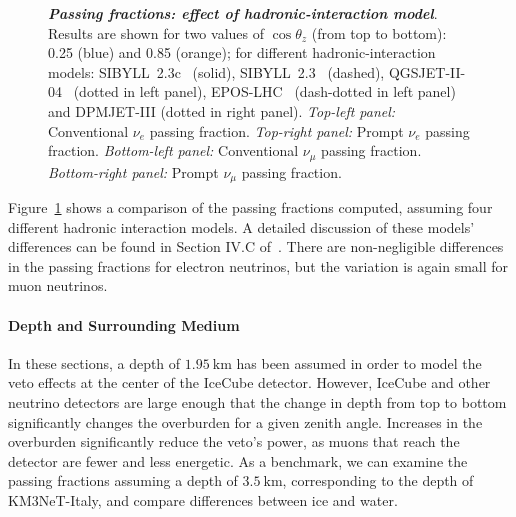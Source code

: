 \begin{figure}[h!]
{	}
	\caption{\textbf{\textit{Passing fractions: effect of hadronic-interaction model}}. Results are shown for two values of $\cos\theta_z$ (from top to bottom): 0.25 (blue) and 0.85 (orange); for different hadronic-interaction models: SIBYLL~2.3c~\cite{Riehn:2017mfm} (solid), SIBYLL~2.3~\cite{Engel:2015dxa, Riehn:2015oba} (dashed), QGSJET-II-04~\cite{Ostapchenko:2010vb} (dotted in left panel), EPOS-LHC~\cite{Pierog:2013ria} (dash-dotted in left panel) and DPMJET-III\cite{Roesler:2000he} (dotted in right panel).
		\textit{Top-left panel:} Conventional $\nu_e$ passing fraction. \textit{Top-right panel:} Prompt $\nu_e$ passing fraction. \textit{Bottom-left panel:} Conventional $\nu_\mu$ passing fraction. \textit{Bottom-right panel:} Prompt $\nu_\mu$ passing fraction.} \vspace{1cm}
	\label{fig:nue-hadronic-model-effect}
\end{figure}

Figure~\ref{fig:nue-hadronic-model-effect} shows a comparison of the passing fractions computed, assuming four different hadronic interaction models.
A detailed discussion of these models' differences can be found in Section IV.C of~\cite{Arguelles:2018awr}.
There are non-negligible differences in the passing fractions for electron neutrinos, but the variation is again small for muon neutrinos.

\paragraph{Depth and Surrounding Medium}
In these sections, a depth of $\SI{1.95}\km$ has been assumed in order to model the veto effects at the center of the IceCube detector.
However, IceCube and other neutrino detectors are large enough that the change in depth from top to bottom significantly changes the overburden for a given zenith angle.
Increases in the overburden significantly reduce the veto's power, as muons that reach the detector are fewer and less energetic.
As a benchmark, we can examine the passing fractions assuming a depth of $\SI{3.5}\km$, corresponding to the depth of KM3NeT-Italy, and compare differences between ice and water.

